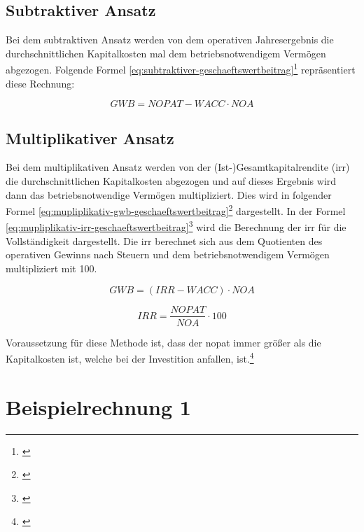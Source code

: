 \subsection{Subtraktiver Ansatz}

Bei dem subtraktiven Ansatz werden von dem operativen Jahresergebnis die durchschnittlichen Kapitalkosten mal dem betriebsnotwendigem Vermögen abgezogen. Folgende Formel \eqref{eq:subtraktiver-geschaeftswertbeitrag}\footnote{\cite{wikipedia-eva}} repräsentiert diese Rechnung:

\begin{equation}
    GWB = NOPAT - WACC \cdot NOA
    \label{eq:subtraktiver-geschaeftswertbeitrag}
\end{equation}

\subsection{Multiplikativer Ansatz}

Bei dem multiplikativen Ansatz werden von der (Ist-)Gesamtkapitalrendite (\ac{irr}) die durchschnittlichen Kapitalkosten abgezogen und auf dieses Ergebnis wird dann das betriebsnotwendige Vermögen multipliziert. Dies wird in folgender Formel \eqref{eq:mupliplikativ-gwb-geschaeftswertbeitrag}\footnote{\cite{wikipedia-eva}} dargestellt. In der Formel \eqref{eq:mupliplikativ-irr-geschaeftswertbeitrag}\footnote{\cite{controllingportal-eva}} wird die Berechnung der \ac{irr} für die Vollständigkeit dargestellt. Die \ac{irr} berechnet sich aus dem Quotienten des operativen Gewinns nach Steuern und dem betriebsnotwendigem Vermögen multipliziert mit 100.

\begin{equation}
    GWB = (IRR - WACC) \cdot NOA
    \label{eq:mupliplikativ-gwb-geschaeftswertbeitrag}
\end{equation}

\begin{equation}
    IRR = \frac{NOPAT}{NOA} \cdot 100
    \label{eq:mupliplikativ-irr-geschaeftswertbeitrag}
\end{equation}

\bigskip

\noindent
Voraussetzung für diese Methode ist, dass der \ac{nopat} immer größer als die Kapitalkosten ist, welche bei der Investition anfallen, ist.\footnote{\cite{bwllexicon-eva}}

\section{Beispielrechnung 1}

